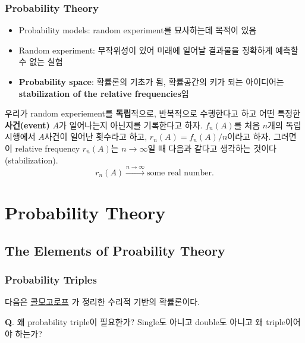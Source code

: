\documentclass[
  letterpaper,
  DIV=11,
  numbers=noendperiod]{scrreprt}
\theoremstyle{plain}
\theoremstyle{definition}
\theoremstyle{definition}
\theoremstyle{plain}
\theoremstyle{plain}
\theoremstyle{remark}
\begin{document}
\section{Probability Theory}\label{probability-theory}

\begin{itemize}
\item
  Probability models: random experiment를 묘사하는데 목적이 있음
\item
  Random experiment: 무작위성이 있어 미래에 일어날 결과물을 정확하게
  예측할 수 없는 실험
\item
  \textbf{Probability space}: 확률론의 기초가 됨, 확률공간의 키가 되는
  아이디어는 \textbf{stabilization of the relative frequencies}임
\end{itemize}

우리가 random experiement를 \textbf{독립}적으로, 반복적으로 수행한다고
하고 어떤 특정한 \textbf{사건(event)} \(A\)가 일어나는지 아닌지를
기록한다고 하자. \(f_n (A)\)를 처음 \(n\)개의 독립시행에서 \(A\)사건이
일어난 횟수라고 하고, \(r_n (A) = f_n (A)/n\)이라고 하자. 그러면 이
relative frequency \(r_n (A)\)는 \(n\rightarrow \infty\)일 때 다음과
같다고 생각하는 것이다(stabilization). \[
r_n(A) \stackrel{n\rightarrow \infty}{\longrightarrow} \text{some real number.}
\]

\part{Probability Theory}

\chapter{The Elements of Proability
Theory}\label{the-elements-of-proability-theory}

\section{Probability Triples}\label{probability-triples}

다음은
\href{https://en.wikipedia.org/wiki/Andrey_Kolmogorov}{콜모고로프} 가
정리한 수리적 기반의 확률론이다.

\textbf{Q}. 왜 probability triple이 필요한가? Single도 아니고 double도
아니고 왜 triple이어야 하는가?
\end{document}
